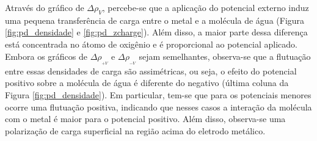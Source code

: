 Através do gráfico de $ \Delta\rho_{V} $, percebe-se que a aplicação do potencial externo induz uma pequena transferência de carga entre o metal e a molécula de água (Figura \ref{fig:pd_densidade} e \ref{fig:pd_zcharge}). Além disso, a maior parte dessa diferença está concentrada no átomo de oxigênio e é proporcional ao potencial aplicado. Embora os gráficos de $ \Delta\rho_{ _{+V}} $ e $ \Delta\rho_{ _{-V}} $ sejam semelhantes, observa-se que a flutuação entre essas densidades de carga são assimétricas, ou seja, o efeito do potencial positivo sobre a molécula de água é diferente do negativo (última coluna da Figura \ref{fig:pd_densidade}). Em particular, tem-se que para os potenciais menores ocorre uma flutuação positiva, indicando que nesses casos a interação da molécula com o metal é maior para o potencial positivo. Além disso, observa-se uma polarização de carga superficial na região acima do eletrodo metálico. 

